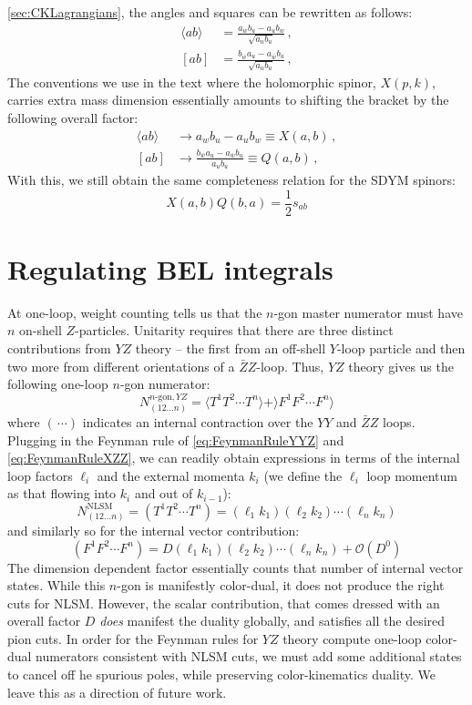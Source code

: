 \documentclass[11pt,letter]{article}
\begin{document}
\cref{sec:CKLagrangians}, the angles and squares can be rewritten as
follows:
\begin{align}
\langle ab \rangle &= \frac{a_w b_u-a_u b_w}{\sqrt{a_ub_u}}\,,
\\
[ab] &= \frac{b_{\bar{w}}a_u-a_{\bar{w}}b_u}{\sqrt{a_ub_u}}\,,
\end{align}
The conventions we use in the text where the holomorphic spinor,
$X(p,k)$, carries extra mass dimension essentially amounts to shifting
the bracket by the following overall factor:
\begin{align}
\langle ab \rangle &\rightarrow a_w b_u-a_u b_w \equiv X(a,b)\,,
\\
[ab] &\rightarrow \frac{b_{\bar{w}}a_u-a_{\bar{w}}b_u}{a_ub_u}\equiv Q(a,b)\,,
\end{align}
With this, we still obtain the same completeness relation for the SDYM spinors:
\begin{equation}
X(a,b)Q(b,a) = \frac{1}{2}s_{ab}
\end{equation}
\section{Regulating BEL integrals}\label{BELreg}
At one-loop, weight counting tells us that the $n$-gon master
numerator must have $n$ on-shell $Z$-particles. Unitarity requires
that there are three distinct contributions from $Y\!Z$ theory -- the
first from an off-shell $Y$-loop particle and then two more from
different orientations of a $\bar{Z}Z$-loop.  Thus, $YZ$ theory gives
us the following one-loop $n$-gon numerator:
\begin{equation}
N^{n\text{-gon},YZ}_{(12...n)} = \langle T^{1}T^{2}\cdots T^{n}\rangle+ \rangle F^1F^2\cdots F^n\rangle
\end{equation}
where $(\,\cdots)$ indicates an internal contraction over the $YY$ and
$\bar{Z}Z$ loops. Plugging in the Feynman rule of
\cref{eq:FeynmanRuleYYZ} and \cref{eq:FeynmanRuleXZZ}, we can readily
obtain expressions in terms of the internal loop factors $\ell_i$ and the
external momenta $k_i$ (we define the $\ell_i$ loop momentum as that
flowing into $k_i$ and out of $k_{i-1}$):
\begin{equation}
N_{(12...n)}^{\text{NLSM}}=(T^{1}T^{2}\cdots T^{n}) = (\ell_1 k_1)(\ell_2 k_2) \cdots (\ell_n k_n)
\end{equation}
and similarly so for the internal vector contribution:
\begin{equation}
 (F^1F^2\cdots F^n) = D (\ell_1 k_1)(\ell_2 k_2) \cdots (\ell_n k_n) + \mathcal{O}(D^0)
\end{equation}
The dimension dependent factor essentially counts that number of
internal vector states. While this $n$-gon is manifestly color-dual,
it does not produce the right cuts for NLSM. However, the scalar
contribution, that comes dressed with an overall factor $D$
\textit{does} manifest the duality globally, and satisfies all the
desired pion cuts. In order for the Feynman rules for $Y\!Z$ theory
compute one-loop color-dual numerators consistent with NLSM cuts, we
must add some additional states to cancel off he spurious poles, while
preserving color-kinematics duality. We leave this as a direction of
future work.
\end{document}
